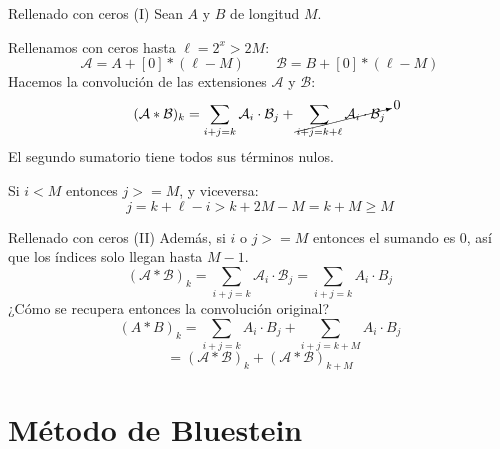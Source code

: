 \documentclass[spanish]{beamer}
\begin{document}
\begin{frame}{Rellenado con ceros (I)}\medskip
    Sean $A$ y $B$ de longitud $M$. 
    
    Rellenamos con ceros hasta $\ell = 2^x > 2M$: 
    \begin{equation*}
        \mathcal{A} = A + [0]*(\ell - M)\ \qquad 
        \mathcal{B} = B + [0]*(\ell - M)
    \end{equation*}
    Hacemos la convolución de las extensiones $\mathcal{A}$ y $\mathcal{B}$:
    \begin{equation*}
        (\mathcal{A}*\mathcal{B})_k = \sum_{i+j=k} \mathcal{A}_i \cdot \mathcal{B}_j + \cancelto{0}{\sum_{i+j=k+\ell} \mathcal{A}_i \cdot \mathcal{B}_j}
    \end{equation*}
    El segundo sumatorio tiene todos sus términos nulos. 
    
    Si $i<M$ entonces $j>=M$, y viceversa:
    \begin{equation*}
        j = k+\ell-i > k+2M-M= k + M \geq M
    \end{equation*}
    
\end{frame}

\begin{frame}{Rellenado con ceros (II)}\medskip
    Además, si $i$ o $j >= M$ entonces el sumando es 0, así que los índices solo llegan hasta $M-1$.
    \begin{equation*}
        (\mathcal{A}*\mathcal{B})_k = \sum_{i+j=k} \mathcal{A}_i \cdot \mathcal{B}_j = \sum_{i+j=k} A_i \cdot B_j
    \end{equation*}
    ¿Cómo se recupera entonces la convolución original?
    \begin{equation*}
        (A*B)_k = \sum_{i+j=k} A_i\cdot B_j + \sum_{i+j=k+M} A_i\cdot B_j
    \end{equation*}
    \begin{equation*}
        = (\mathcal{A}*\mathcal{B})_k + (\mathcal{A}*\mathcal{B})_{k+M}
    \end{equation*}
    
\end{frame}


\section{Método de Bluestein}

\end{document}
